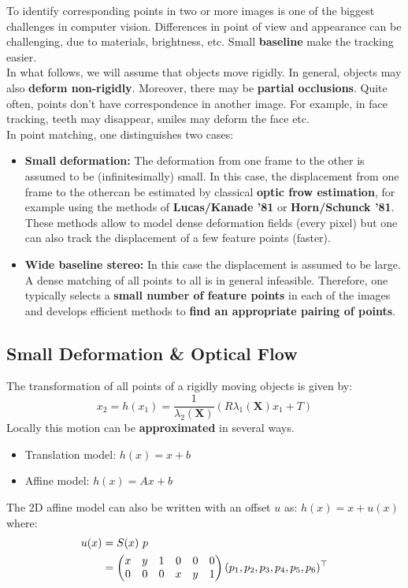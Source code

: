 To identify corresponding points in two or more images is one of the biggest
challenges in computer vision. Differences in point of view and
appearance can be challenging, due to materials, brightness, etc.
Small \textbf{baseline} make the tracking easier.\\

In what follows, we will assume that objects move rigidly.
In general, objects may also \textbf{deform non-rigidly}.
Moreover, there may be \textbf{partial occlusions}.
Quite often, points don't have correspondence in another image.
For example, in face tracking, teeth may disappear, smiles
may deform the face etc.\\

In point matching, one distinguishes two cases:

\begin{itemize}
	\item \textbf{Small deformation:} The deformation from one frame
		to the other is assumed to be (infinitesimally) small.
		In this case, the displacement from one frame to the othercan be estimated
		by classical \textbf{optic frow estimation}, for example using the methods
		of \textbf{Lucas/Kanade '81} or \textbf{Horn/Schunck '81}.
		These methods allow to model dense deformation fields (every pixel)
		but one can also track the displacement of a few feature points (faster).
	\item \textbf{Wide baseline stereo:} In this case the displacement is
		assumed to be large. A dense matching of all points to all is in general
		infeasible. Therefore, one typically selects a
		\textbf{small number of feature points} in each of the images
		and develops efficient methods to
		\textbf{find an appropriate pairing of points}.
\end{itemize}


\subsection{Small Deformation \& Optical Flow}%
\label{sub:small_deformation_optical_flow}


The transformation of all points of a rigidly moving objects is given by:
\[
	x_2 = h(x_1) = \frac{1}{\lambda_2(\bm{X})}
		(R \lambda_1(\bm{X}) x_1 + T)
\]
Locally this motion can be \textbf{approximated} in several ways.
\begin{itemize}
	\item Translation model: $h(x) = x + b$
	\item Affine model: $h(x) = Ax + b$
\end{itemize}
The 2D affine model can also be written with an offset $u$ as:
$h(x) = x + u(x)$ where:
\begin{align*}
	u(x) & = S(x)\ p \\
		 & = \begin{pmatrix}
				x & y & 1 & 0 & 0 & 0 \\
				0 & 0 & 0 & x & y & 1 \\
			\end{pmatrix}
			(p_1,p_2,p_3,p_4,p_5,p_6)^{\top}
\end{align*}

